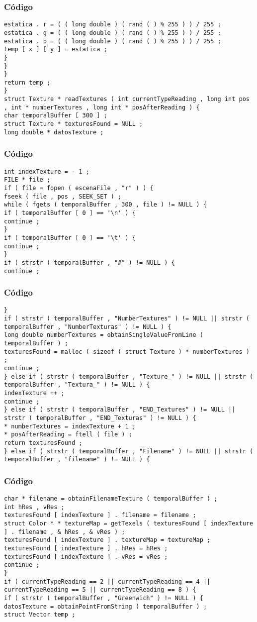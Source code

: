 \documentclass{beamer}
\begin{document}
\begin{frame}[fragile]
\frametitle{C\'odigo}
\begin{verbatim}
estatica . r = ( ( long double ) ( rand ( ) % 255 ) ) / 255 ; 
estatica . g = ( ( long double ) ( rand ( ) % 255 ) ) / 255 ; 
estatica . b = ( ( long double ) ( rand ( ) % 255 ) ) / 255 ; 
temp [ x ] [ y ] = estatica ; 
} 
} 
} 
return temp ; 
} 
struct Texture * readTextures ( int currentTypeReading , long int pos , int * numberTextures , long int * posAfterReading ) { 
char temporalBuffer [ 300 ] ; 
struct Texture * texturesFound = NULL ; 
long double * datosTexture ; 
\end{verbatim}
\end{frame}
\begin{frame}[fragile]
\frametitle{C\'odigo}
\begin{verbatim}
int indexTexture = - 1 ; 
FILE * file ; 
if ( file = fopen ( escenaFile , "r" ) ) { 
fseek ( file , pos , SEEK_SET ) ; 
while ( fgets ( temporalBuffer , 300 , file ) != NULL ) { 
if ( temporalBuffer [ 0 ] == '\n' ) { 
continue ; 
} 
if ( temporalBuffer [ 0 ] == '\t' ) { 
continue ; 
} 
if ( strstr ( temporalBuffer , "#" ) != NULL ) { 
continue ; 
\end{verbatim}
\end{frame}
\begin{frame}[fragile]
\frametitle{C\'odigo}
\begin{verbatim}
} 
if ( strstr ( temporalBuffer , "NumberTextures" ) != NULL || strstr ( temporalBuffer , "NumberTexturas" ) != NULL ) { 
long double numberTextures = obtainSingleValueFromLine ( temporalBuffer ) ; 
texturesFound = malloc ( sizeof ( struct Texture ) * numberTextures ) ; 
continue ; 
} else if ( strstr ( temporalBuffer , "Texture_" ) != NULL || strstr ( temporalBuffer , "Textura_" ) != NULL ) { 
indexTexture ++ ; 
continue ; 
} else if ( strstr ( temporalBuffer , "END_Textures" ) != NULL || strstr ( temporalBuffer , "END_Texturas" ) != NULL ) { 
* numberTextures = indexTexture + 1 ; 
* posAfterReading = ftell ( file ) ; 
return texturesFound ; 
} else if ( strstr ( temporalBuffer , "Filename" ) != NULL || strstr ( temporalBuffer , "filename" ) != NULL ) { 
\end{verbatim}
\end{frame}
\begin{frame}[fragile]
\frametitle{C\'odigo}
\begin{verbatim}
char * filename = obtainFilenameTexture ( temporalBuffer ) ; 
int hRes , vRes ; 
texturesFound [ indexTexture ] . filename = filename ; 
struct Color * * textureMap = getTexels ( texturesFound [ indexTexture ] . filename , & hRes , & vRes ) ; 
texturesFound [ indexTexture ] . textureMap = textureMap ; 
texturesFound [ indexTexture ] . hRes = hRes ; 
texturesFound [ indexTexture ] . vRes = vRes ; 
continue ; 
} 
if ( currentTypeReading == 2 || currentTypeReading == 4 || currentTypeReading == 5 || currentTypeReading == 8 ) { 
if ( strstr ( temporalBuffer , "Greenwich" ) != NULL ) { 
datosTexture = obtainPointFromString ( temporalBuffer ) ; 
struct Vector temp ; 
\end{verbatim}
\end{frame}
\end{document}
